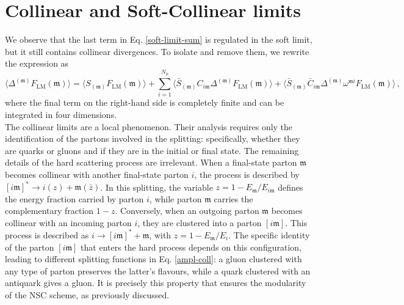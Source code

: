 \documentclass[a4paper, 12pt]{book}
\newcommand{\um}{\mathfrak{m}}
\begin{document}

\section{Collinear and Soft-Collinear limits}
We observe that the last term in Eq. \ref{soft-limit-sum} is regulated in the soft limit, but it still contains collinear divergences. To isolate and remove them, we rewrite the expression as 
\begin{equation}
  \langle \Delta^{(\um)}F_{\mathrm{LM}}(\um) \rangle = \langle S_{(\um)}F_{\mathrm{LM}}(\um) \rangle + \sum_{i=1}^{N_p} \langle \bar{S}_{(\um)}C_{i\um} \Delta^{(\um)} F_{\mathrm{LM}}(\um) \rangle + \langle \bar{S}_{(\um)} \bar{C}_{i\um} \Delta^{(\um)} \omega^{\um i} F_{\mathrm{LM}}(\um) \rangle \, ,
\end{equation}
where the final term on the right-hand side is completely finite and can be integrated in four dimensions. \\
The collinear limits are a local phenomenon. Their analysis requires only the identification of the partons involved in the splitting: specifically, whether they are quarks or gluons and if they are in the initial or final state. The remaining details of the hard scattering process are irrelevant. When a final-state parton $\um$ becomes collinear with another final-state parton $i$, the process is described by $[i\um]^* \to i(z) + \um(\bar{z})$. In this splitting, the variable $z = 1 - E_{\um}/E_{i\um}$ defines the energy fraction carried by parton $i$, while parton $\um$ carries the complementary fraction $1-z$. Conversely, when an outgoing parton $\um$ becomes collinear with an incoming parton $i$, they are clustered into a parton $[i\um]$. This process is described as $i \to [i\um]^* + \um$, with $z = 1 - E_{\um}/E_i$. The specific identity of the parton $[i\um]$ that enters the hard process depends on this configuration, leading to different splitting functions in Eq. \ref{ampl-coll}: a gluon clustered with any type of parton preserves the latter's flavours, while a quark clustered with an antiquark gives a gluon. It is precisely this property that ensures the modularity of the NSC scheme, as previously discussed. \\
\end{document}

